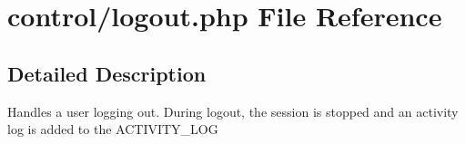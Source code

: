 \hypertarget{logout_8php}{\section{control/logout.php File Reference}
\label{logout_8php}
}


\subsection{Detailed Description}
Handles a user logging out. During logout, the session is stopped and an activity log is added to the A\-C\-T\-I\-V\-I\-T\-Y\-\_\-\-L\-O\-G 